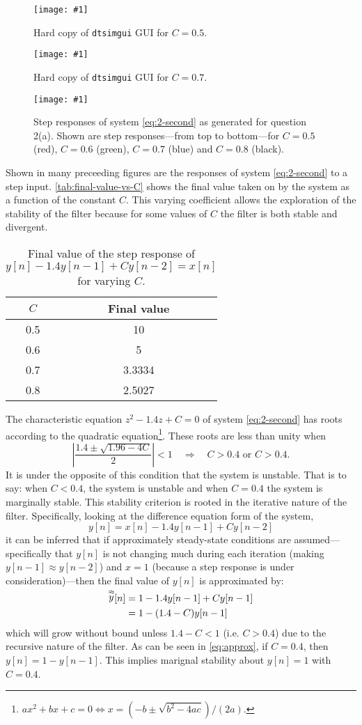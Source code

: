 \documentclass{ajhlabreport}
\newcommand{\savedfig}[2]{
	\begin{figure}[H]
	\centering
	\texttt{[image: \#1]}
	\caption{#2}
	\end{figure}
}
\newcommand{\savedhardcopy}[2]{
	\begin{figure}[H]
	\centering
	\texttt{[image: \#1]}
	\caption{#2}
	\end{figure}
}
\begin{document}
\savedhardcopy{p22response5.pdf}{Hard copy of \texttt{dtsimgui} GUI for $C=0.5$.\label{fig:p22response5}}
\savedhardcopy{p22response7.pdf}{Hard copy of \texttt{dtsimgui} GUI for $C=0.7$.\label{fig:p22response7}}
\savedfig{p2_1_final_values.png}{Step responses of system \eqref{eq:2-second} as generated for question 2(a). Shown are step responses---from top to bottom---for $C=0.5$ ({\color{red}red}), $C=0.6$ ({\color{green}green}), $C=0.7$ ({\color{blue}blue}) and $C=0.8$ (black).\label{fig:final-values}}

Shown in many preceeding figures are the responses of system \eqref{eq:2-second}
to a step input. \autoref{tab:final-value-vs-C} shows the final value taken on
by the system as a function of the constant $C$. This varying coefficient allows
the exploration of the stability of the filter because for some values of $C$
the filter is both stable and divergent.

\begin{table}[H]
\centering
\caption{Final value of the step response of $y[n] - 1.4y[n-1] + C y[n-2] =
x[n]$ for varying $C$.\label{tab:final-value-vs-C}}
\begin{tabular}{cc}
$C$ & Final value \\
\midrule
0.5 & 10 \\
0.6 & 5 \\
0.7 & 3.3334 \\
0.8 & 2.5027 \\
\end{tabular}
\end{table}

The characteristic equation $z^2 - 1.4z + C = 0$ of system \eqref{eq:2-second}
has roots according to the quadratic equation\footnote{$ax^2+bx+c=0 \iff x=(-b
\pm \sqrt{b^2 - 4 a c})/(2a)$.}. These roots are less than unity when \[ \left|
\frac{1.4 \pm \sqrt{1.96 - 4C}}{2} \right| < 1 \quad \Rightarrow \quad \boxed{C
> 0.4 \text{ or } C > 0.4}\text{.} \] It is under the opposite of this condition
that the system is unstable. That is to say: when $C<0.4$, the system is
unstable and when $C=0.4$ the system is marginally stable. This stability
criterion is rooted in the iterative nature of the filter. Specifically, looking
at the difference equation form of the system, \[ y[n] = x[n] - 1.4y[n-1] + C
y[n-2] \] it can be inferred that if approximately steady-state conditions are
assumed---specifically that $y[n]$ is not changing much during each iteration
(making $y[n-1]\approx{}y[n-2]$) and $x=1$ (because a step response is under
consideration)---then the final value of $y[n]$ is approximated by:
\begin{align}
\smash{\stackrel{\approx}{y}}[n] &= 1 - 1.4y[n-1] + C y[n-1] \notag \\
                                 &= 1 - (1.4 - C) y[n-1] \label{eq:approx}
\end{align}
which will grow without bound unless $1.4 - C < 1$ (i.e. $C>0.4$) due to the
recursive nature of the filter. As can be seen in \eqref{eq:approx}, if $C=0.4$,
then $y[n]=1 - y[n-1]$. This implies marignal stability about $y[n]=1$ with
$C=0.4$.
\end{document}
